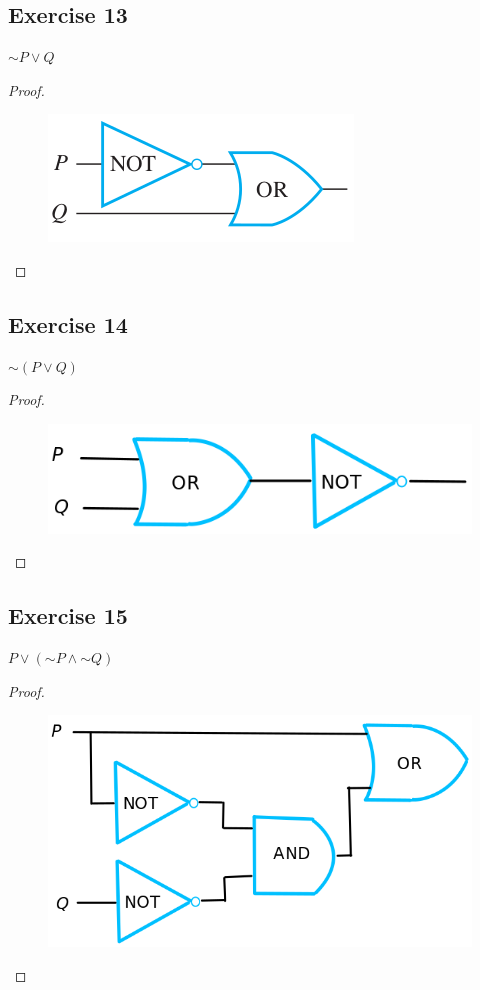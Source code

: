 \documentclass[14pt]{extarticle}
\begin{document}
\subsection{Exercise 13} ${\sim P} \vee Q$
\begin{proof} \begin{figure}[ht!] \centering
\includegraphics[scale=0.5]{../images/2.4.13.png} \end{figure} \end{proof}

\subsection{Exercise 14} ${\sim(P \vee Q)}$
\begin{proof} \begin{figure}[ht!] \centering
\includegraphics[scale=0.3]{../images/2.4.14.png} \end{figure} \end{proof}

\subsection{Exercise 15} $P \vee ({\sim P} \wedge {\sim Q})$
\begin{proof} \begin{figure}[ht!] \centering
\includegraphics[scale=0.3]{../images/2.4.15.png} \end{figure} \end{proof}
\end{document}
